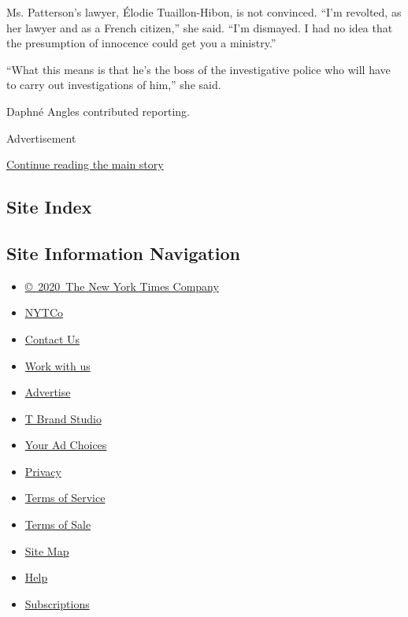 Ms. Patterson's lawyer, Élodie Tuaillon-Hibon, is not convinced. ``I'm
revolted, as her lawyer and as a French citizen,'' she said. ``I'm
dismayed. I had no idea that the presumption of innocence could get you
a ministry.''

``What this means is that he's the boss of the investigative police who
will have to carry out investigations of him,'' she said.

Daphné Angles contributed reporting.

Advertisement

\protect\hyperlink{after-bottom}{Continue reading the main story}

\hypertarget{site-index}{%
\subsection{Site Index}\label{site-index}}

\hypertarget{site-information-navigation}{%
\subsection{Site Information
Navigation}\label{site-information-navigation}}

\begin{itemize}
\tightlist
\item
  \href{https://help.nytimes3xbfgragh.onion/hc/en-us/articles/115014792127-Copyright-notice}{©~2020~The
  New York Times Company}
\end{itemize}

\begin{itemize}
\tightlist
\item
  \href{https://www.nytco.com/}{NYTCo}
\item
  \href{https://help.nytimes3xbfgragh.onion/hc/en-us/articles/115015385887-Contact-Us}{Contact
  Us}
\item
  \href{https://www.nytco.com/careers/}{Work with us}
\item
  \href{https://nytmediakit.com/}{Advertise}
\item
  \href{http://www.tbrandstudio.com/}{T Brand Studio}
\item
  \href{https://www.nytimes3xbfgragh.onion/privacy/cookie-policy\#how-do-i-manage-trackers}{Your
  Ad Choices}
\item
  \href{https://www.nytimes3xbfgragh.onion/privacy}{Privacy}
\item
  \href{https://help.nytimes3xbfgragh.onion/hc/en-us/articles/115014893428-Terms-of-service}{Terms
  of Service}
\item
  \href{https://help.nytimes3xbfgragh.onion/hc/en-us/articles/115014893968-Terms-of-sale}{Terms
  of Sale}
\item
  \href{https://spiderbites.nytimes3xbfgragh.onion}{Site Map}
\item
  \href{https://help.nytimes3xbfgragh.onion/hc/en-us}{Help}
\item
  \href{https://www.nytimes3xbfgragh.onion/subscription?campaignId=37WXW}{Subscriptions}
\end{itemize}

